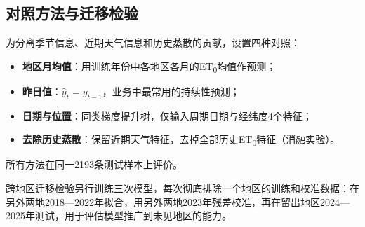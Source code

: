 \subsection{对照方法与迁移检验}
为分离季节信息、近期天气信息和历史蒸散的贡献，设置四种对照：
\begin{itemize}
\item \textbf{地区月均值}：用训练年份中各地区各月的ET\textsubscript{0}均值作预测；
\item \textbf{昨日值}：$\widehat y_t=y_{t-1}$，业务中最常用的持续性预测；
\item \textbf{日期与位置}：同类梯度提升树，仅输入周期日期与经纬度4个特征；
\item \textbf{去除历史蒸散}：保留近期天气特征，去掉全部历史ET\textsubscript{0}特征（消融实验）。
\end{itemize}
所有方法在同一2193条测试样本上评价。

跨地区迁移检验另行训练三次模型，每次彻底排除一个地区的训练和校准数据：在另外两地2018—2022年拟合，用另外两地2023年残差校准，再在留出地区2024—2025年测试，用于评估模型推广到未见地区的能力。
